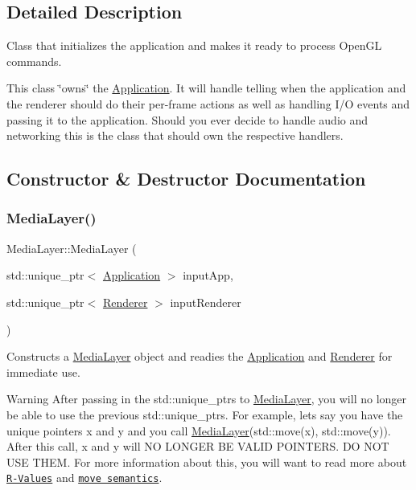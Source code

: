 \subsection{Detailed Description}
Class that initializes the application and makes it ready to process Open\+GL commands.

This class \char`\"{}owns\char`\"{} the \hyperlink{class_application}{Application}. It will handle telling when the application and the renderer should do their per-\/frame actions as well as handling I/O events and passing it to the application. Should you ever decide to handle audio and networking this is the class that should own the respective handlers.

\subsection{Constructor \& Destructor Documentation}
\hypertarget{class_media_layer_aea3b3bc36411af90517692b110d2829a}{}\label{class_media_layer_aea3b3bc36411af90517692b110d2829a}
\subsubsection{\texorpdfstring{Media\+Layer()}{MediaLayer()}}
{\footnotesize\ttfamily Media\+Layer\+::\+Media\+Layer (\begin{DoxyParamCaption}\item[{std\+::unique\+\_\+ptr$<$ \hyperlink{class_application}{Application} $>$}]{input\+App,  }\item[{std\+::unique\+\_\+ptr$<$ \hyperlink{class_renderer}{Renderer} $>$}]{input\+Renderer }\end{DoxyParamCaption})}



Constructs a \hyperlink{class_media_layer}{Media\+Layer} object and readies the \hyperlink{class_application}{Application} and \hyperlink{class_renderer}{Renderer} for immediate use.

\begin{DoxyWarning}{Warning}
After passing in the std\+::unique\+\_\+ptr\textquotesingle{}s to \hyperlink{class_media_layer}{Media\+Layer}, you will no longer be able to use the previous std\+::unique\+\_\+ptr\textquotesingle{}s. For example, let\textquotesingle{}s say you have the unique pointers x and y and you call \hyperlink{class_media_layer}{Media\+Layer}(std\+::move(x), std\+::move(y)). After this call, x and y will NO L\+O\+N\+G\+ER BE V\+A\+L\+ID P\+O\+I\+N\+T\+E\+RS. DO N\+OT U\+SE T\+H\+EM. For more information about this, you will want to read more about \href{http://thbecker.net/articles/rvalue_references/section_01.html}{\tt R-\/\+Values} and \href{http://thbecker.net/articles/rvalue_references/section_02.html}{\tt move semantics}.
\end{DoxyWarning}


